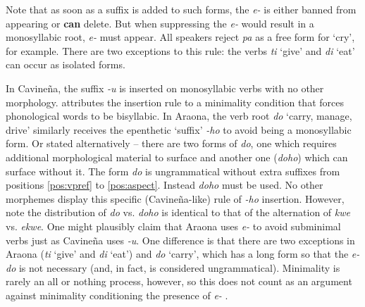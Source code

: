 \documentclass[output=paper,hidelinks]{langscibook}
\begin{document}
Note that as soon as a suffix is added to such forms, the \textit{e-} is either banned from appearing or \textbf{can} delete. But when suppressing the \textit{e-} would result in a monosyllabic root, \textit{e-} must appear. All speakers reject \textit{pa} as a free form for `cry', for example. There are two exceptions to this rule: the verbs \textit{ti} `give' and \textit{di} `eat' can occur as isolated forms. 

In Cavineña, the suffix \textit{-u} is inserted on monosyllabic verbs with no other morphology. \citet[41]{Guillaume2008} attributes the insertion rule to a minimality condition that forces phonological words to be bisyllabic. In Araona, the verb root \textit{do} `carry, manage, drive' similarly receives the epenthetic `suffix' \textit{-ho} to avoid being a monosyllabic form. Or stated alternatively -- there are two forms of \textit{do}, one which requires additional morphological material to surface and another one (\textit{doho}) which can surface without it. The form \textit{do} is ungrammatical without extra suffixes from positions \ref{pos:vpref} to \ref{pos:aspect}. Instead \textit{doho} must be used. No other morphemes display this specific (Cavineña-like) rule of \textit{-ho} insertion. However, note the distribution of \textit{do} vs. \textit{doho} is identical to that of the alternation of \textit{kwe} vs. \textit{ekwe}. One might plausibly claim that Araona uses \textit{e-} to avoid subminimal verbs just as Cavineña uses \textit{-u}. One difference is that there are two exceptions in Araona (\textit{ti} `give' and \textit{di} `eat') and \textit{do} `carry', which has a long form so that the \textit{e-do} is not necessary (and, in fact, is considered ungrammatical). Minimality is rarely an all or nothing process, however, so this does not count as an argument against minimality conditioning the presence of \textit{e-} \citep[69-70]{garrett1999}.
\end{document}
